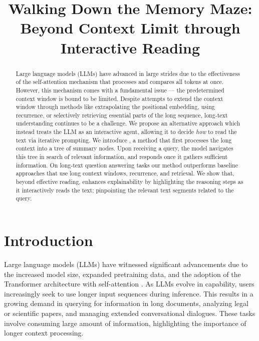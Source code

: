 \title{Walking Down the Memory Maze: Beyond Context Limit through Interactive Reading}



\maketitle
\renewcommand{\thefootnote}{\fnsymbol{footnote}}

\begin{abstract}
Large language models (LLMs) have advanced in large strides due to the effectiveness of the self-attention mechanism that processes and compares all tokens at once.
However, this mechanism comes with a fundamental issue --- the predetermined context window is bound to be limited. Despite attempts to extend the context window through methods like extrapolating the positional embedding, using recurrence, or selectively retrieving essential parts of the long sequence, long-text understanding continues to be a challenge.
We propose an alternative approach which instead treats the LLM as an interactive agent,  allowing it to decide \textit{how} to read the text via iterative  prompting.
We introduce \sysname{}, a method that first processes the long context into a tree of summary nodes. Upon receiving a query, the model navigates this tree in search of relevant information, and responds once it gathers sufficient information. On long-text question answering tasks
our method outperforms  baseline approaches that use long context windows, recurrence, and retrieval. We show that, beyond effective reading, \sysname{} enhances explainability by highlighting the reasoning steps as it interactively reads the text; pinpointing the relevant text segments related to the query.\end{abstract}

\section{Introduction}\label{sec:intro}

Large language models (LLMs) have witnessed significant advancements due to the increased model size, expanded pretraining data, and the adoption of the Transformer architecture with self-attention \citep{vaswani2017attention}. As LLMs evolve in capability, users increasingly seek to use longer input sequences during inference. This results in a growing demand in querying for information in long documents, analyzing legal or scientific papers, and managing extended conversational dialogues. 
These tasks involve consuming large amount of information, highlighting the importance of longer context processing.


